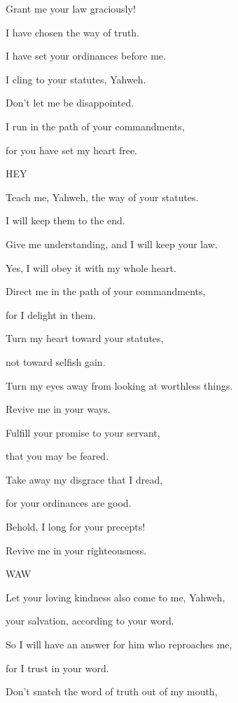 {\par }{\QB Grant me your law graciously!
\par }{\Q {}I have chosen the way of truth.
\par }{\QB I have set your ordinances before me.
\par }{\Q {}I cling to your statutes, Yahweh.
\par }{\QB Don’t let me be disappointed.
\par }{\Q {}I run in the path of your commandments,
\par }{\QB for you have set my heart free.
\par }{\D HEY
\par }{\Q {}Teach me, Yahweh, the way of your statutes.
\par }{\QB I will keep them to the end.
\par }{\Q {}Give me understanding, and I will keep your law.
\par }{\QB Yes, I will obey it with my whole heart.
\par }{\Q {}Direct me in the path of your commandments,
\par }{\QB for I delight in them.
\par }{\Q {}Turn my heart toward your statutes,
\par }{\QB not toward selfish gain.
\par }{\Q {}Turn my eyes away from looking at worthless things.
\par }{\QB Revive me in your ways.
\par }{\Q {}Fulfill your promise to your servant,
\par }{\QB that you may be feared.
\par }{\Q {}Take away my disgrace that I dread,
\par }{\QB for your ordinances are good.
\par }{\Q {}Behold, I long for your precepts!
\par }{\QB Revive me in your righteousness.
\par }{\D WAW
\par }{\Q {}Let your loving kindness also come to me, Yahweh,
\par }{\QB your salvation, according to your word.
\par }{\Q {}So I will have an answer for him who reproaches me,
\par }{\QB for I trust in your word.
\par }{\Q {}Don’t snatch the word of truth out of my mouth,
}
